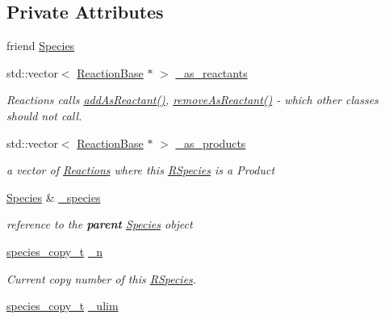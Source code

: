 \subsection*{Private Attributes}
\begin{DoxyCompactItemize}
\item 
friend \hyperlink{classchem_1_1RSpecies_af22c5fa6d6a8be2cd26b77fc4cbb820f}{Species}
\item 
std\-::vector$<$ \hyperlink{classchem_1_1ReactionBase}{Reaction\-Base} $\ast$ $>$ \hyperlink{classchem_1_1RSpecies_a7ffda464bbe610c372cac83e6e735023}{\-\_\-as\-\_\-reactants}
\begin{DoxyCompactList}\small\item\em Reactions calls \hyperlink{classchem_1_1RSpecies_a2f69141d801e4660ab411953fef74ea2}{add\-As\-Reactant()}, \hyperlink{classchem_1_1RSpecies_ab8f32e15791cfddea7cf4cac5a39c0fa}{remove\-As\-Reactant()} -\/ which other classes should not call. \end{DoxyCompactList}\item 
std\-::vector$<$ \hyperlink{classchem_1_1ReactionBase}{Reaction\-Base} $\ast$ $>$ \hyperlink{classchem_1_1RSpecies_ad4d3712865ed15fd9b581810ffe1b0e7}{\-\_\-as\-\_\-products}
\begin{DoxyCompactList}\small\item\em a vector of \hyperlink{classchem_1_1Reaction}{Reactions} where this \hyperlink{classchem_1_1RSpecies}{R\-Species} is a Product \end{DoxyCompactList}\item 
\hyperlink{classchem_1_1Species}{Species} \& \hyperlink{classchem_1_1RSpecies_a3a979b9226800417c7aad81a2162fac5}{\-\_\-species}
\begin{DoxyCompactList}\small\item\em reference to the {\bfseries parent} \hyperlink{classchem_1_1Species}{Species} object \end{DoxyCompactList}\item 
\hyperlink{common_8h_a3503f321fd36304ee274141275cca586}{species\-\_\-copy\-\_\-t} \hyperlink{classchem_1_1RSpecies_a60e53ebfe464923452c54322dfd479dc}{\-\_\-n}
\begin{DoxyCompactList}\small\item\em Current copy number of this \hyperlink{classchem_1_1RSpecies}{R\-Species}. \end{DoxyCompactList}\item 
\hyperlink{common_8h_a3503f321fd36304ee274141275cca586}{species\-\_\-copy\-\_\-t} \hyperlink{classchem_1_1RSpecies_a189084cfe75e004f42a6a27b2c1c09ad}{\-\_\-ulim}

\end{DoxyCompactItemize}
